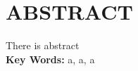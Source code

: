 \newpage
\thispagestyle{empty}
\section*{\textbf{} ABSTRACT}
There is abstract\\
\textbf{Key Words: } a, a, a
